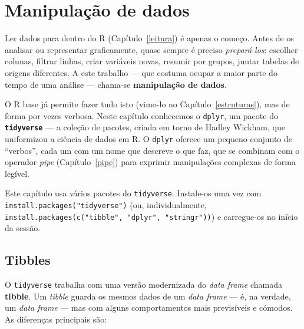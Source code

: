 \documentclass[
  portuguese,
  11pt,
  openany]{book}
\begin{document}
\chapter{Manipulação de dados}\label{manipulacao}

Ler dados para dentro do R (Capítulo~\ref{leitura}) é apenas o começo. Antes de os
analisar ou representar graficamente, quase sempre é preciso \emph{prepará-los}: escolher
colunas, filtrar linhas, criar variáveis novas, resumir por grupos, juntar tabelas de
origens diferentes. A este trabalho --- que costuma ocupar a maior parte do tempo de uma
análise --- chama-se \textbf{manipulação de dados}.

O R base já permite fazer tudo isto (vimo-lo no Capítulo~\ref{estruturas}), mas de
forma por vezes verbosa. Neste capítulo conhecemos o \texttt{dplyr}, um pacote do
\textbf{\texttt{tidyverse}} --- a coleção de pacotes, criada em torno de Hadley Wickham, que
uniformizou a ciência de dados em R. O \texttt{dplyr} oferece um pequeno conjunto de ``verbos'',
cada um com um nome que descreve o que faz, que se combinam com o operador \emph{pipe}
(Capítulo~\ref{pipe}) para exprimir manipulações complexas de forma legível.

Este capítulo usa vários pacotes do \texttt{tidyverse}. Instale-os uma vez com
\texttt{install.packages("tidyverse")} (ou, individualmente,
\texttt{install.packages(c("tibble",\ "dplyr",\ "stringr"))}) e carregue-os no início da sessão.

\section{Tibbles}\label{tibbles}

O \texttt{tidyverse} trabalha com uma versão modernizada do \emph{data frame} chamada \textbf{tibble}.
Um \emph{tibble} guarda os mesmos dados de um \emph{data frame} --- é, na verdade, um \emph{data frame} ---
mas com alguns comportamentos mais previsíveis e cómodos. As diferenças principais são:
\end{document}
